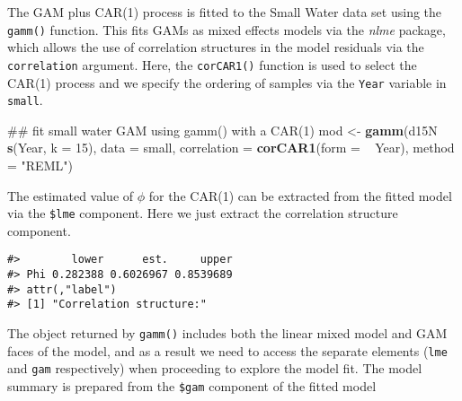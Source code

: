 \documentclass[12pt,]{article}
\newenvironment{Shaded}{\begin{snugshade}}{\end{snugshade}}
\newcommand{\KeywordTok}[1]{\textcolor[rgb]{0.13,0.29,0.53}{\textbf{{#1}}}}
\newcommand{\DataTypeTok}[1]{\textcolor[rgb]{0.13,0.29,0.53}{{#1}}}
\newcommand{\DecValTok}[1]{\textcolor[rgb]{0.00,0.00,0.81}{{#1}}}
\newcommand{\StringTok}[1]{\textcolor[rgb]{0.31,0.60,0.02}{{#1}}}
\newcommand{\NormalTok}[1]{{#1}}
\begin{document}
The GAM plus CAR(1) process is fitted to the Small Water data set using
the \texttt{gamm()} function. This fits GAMs as mixed effects models via
the \emph{nlme} package, which allows the use of correlation structures
in the model residuals via the \texttt{correlation} argument. Here, the
\texttt{corCAR1()} function is used to select the CAR(1) process and we
specify the ordering of samples via the \texttt{Year} variable in
\texttt{small}.

\begin{Shaded}
\begin{Highlighting}[]
\NormalTok{## fit small water GAM using gamm() with a CAR(1)}
\NormalTok{mod <-}\StringTok{ }\KeywordTok{gamm}\NormalTok{(d15N ~}\StringTok{ }\KeywordTok{s}\NormalTok{(Year, }\DataTypeTok{k =} \DecValTok{15}\NormalTok{), }\DataTypeTok{data =} \NormalTok{small,}
            \DataTypeTok{correlation =} \KeywordTok{corCAR1}\NormalTok{(}\DataTypeTok{form =} \NormalTok{~}\StringTok{ }\NormalTok{Year), }\DataTypeTok{method =} \StringTok{"REML"}\NormalTok{)}
\end{Highlighting}
\end{Shaded}

The estimated value of \(\phi\) for the CAR(1) can be extracted from the
fitted model via the \texttt{\$lme} component. Here we just extract the
correlation structure component.

\begin{Shaded}
\end{Shaded}

\begin{verbatim}
#>        lower      est.     upper
#> Phi 0.282388 0.6026967 0.8539689
#> attr(,"label")
#> [1] "Correlation structure:"
\end{verbatim}

The object returned by \texttt{gamm()} includes both the linear mixed
model and GAM faces of the model, and as a result we need to access the
separate elements (\texttt{lme} and \texttt{gam} respectively) when
proceeding to explore the model fit. The model summary is prepared from
the \texttt{\$gam} component of the fitted model

\begin{Shaded}
\end{Shaded}
\end{document}
